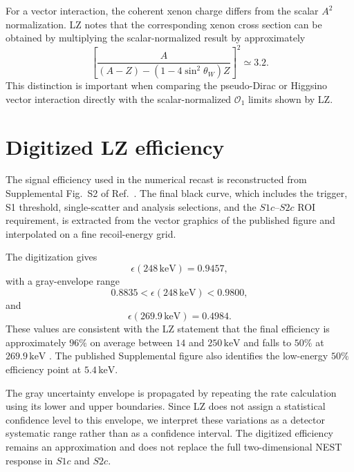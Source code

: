 \documentclass[aps,prd,reprint,superscriptaddress,nofootinbib,longbibliography,floatfix]{revtex4-2}
\newcommand{\keV}{\mathrm{keV}}
\begin{document}
For a vector interaction, the coherent xenon charge differs from the scalar $A^2$ normalization. LZ notes that the corresponding xenon cross section can be obtained by multiplying the scalar-normalized result by approximately
\begin{equation}
\left[
\frac{A}
{
(A-Z)
-
\left(
1-4\sin^2\theta_W
\right)Z
}
\right]^2
\simeq
3.2.
\label{eq:vector_conversion}
\end{equation}
This distinction is important when comparing the pseudo-Dirac or Higgsino vector interaction directly with the scalar-normalized $\mathcal{O}_1$ limits shown by LZ.


\section{Digitized LZ efficiency}
\label{app:efficiency}

The signal efficiency used in the numerical recast is reconstructed from Supplemental Fig.~S2 of Ref.~\cite{LZ2026Extended}. The final black curve, which includes the trigger, S1 threshold, single-scatter and analysis selections, and the $S1c$--$S2c$ ROI requirement, is extracted from the vector graphics of the published figure and interpolated on a fine recoil-energy grid.

The digitization gives
\begin{equation}
\epsilon(248\,\keV)=0.9457,
\end{equation}
with a gray-envelope range
\begin{equation}
0.8835<\epsilon(248\,\keV)<0.9800,
\end{equation}
and
\begin{equation}
\epsilon(269.9\,\keV)=0.4984.
\end{equation}
These values are consistent with the LZ statement that the final efficiency is approximately $96\%$ on average between $14$ and $250\,\keV$ and falls to $50\%$ at $269.9\,\keV$ \cite{LZ2026Extended}. The published Supplemental figure also identifies the low-energy $50\%$ efficiency point at $5.4\,\keV$.

The gray uncertainty envelope is propagated by repeating the rate calculation using its lower and upper boundaries. Since LZ does not assign a statistical confidence level to this envelope, we interpret these variations as a detector systematic range rather than as a confidence interval. The digitized efficiency remains an approximation and does not replace the full two-dimensional NEST response in $S1c$ and $S2c$.
\end{document}
